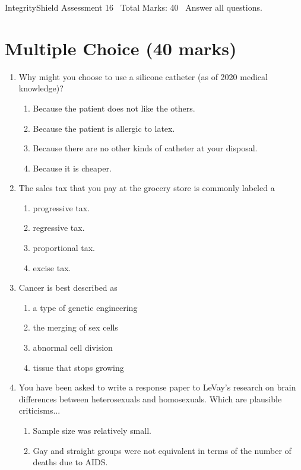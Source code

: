 \documentclass[12pt]{article}
\begin{document}
\begin{center}
IntegrityShield Assessment 16 \
Total Marks: 40 \
Answer all questions.
\end{center}

\section*{Multiple Choice (40 marks)}
\begin{enumerate}[label=\arabic*.]
\item Why might you choose to use a silicone catheter (as of 2020 medical knowledge)?
\begin{enumerate}[label=(\alph*)]
    \item Because the patient does not like the others.
    \item Because the patient is allergic to latex.
    \item Because there are no other kinds of catheter at your disposal.
    \item Because it is cheaper.
\end{enumerate}
\item The sales tax that you pay at the grocery store is commonly labeled a
\begin{enumerate}[label=(\alph*)]
    \item progressive tax.
    \item regressive tax.
    \item proportional tax.
    \item excise tax.
\end{enumerate}
\item Cancer is best described as
\begin{enumerate}[label=(\alph*)]
    \item a type of genetic engineering
    \item the merging of sex cells
    \item abnormal cell division
    \item tissue that stops growing
\end{enumerate}
\item You have been asked to write a response paper to LeVay's research on brain differences between heterosexuals and homosexuals. Which are plausible criticisms...
\begin{enumerate}[label=(\alph*)]
    \item Sample size was relatively small.
    \item Gay and straight groups were not equivalent in terms of the number of deaths due to AIDS.

\end{enumerate}
\end{enumerate}
\end{document}
